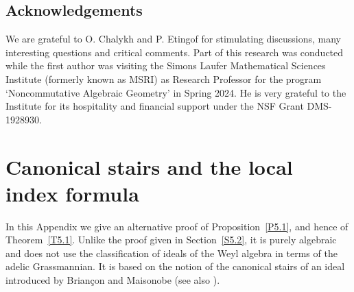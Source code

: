\documentclass[11pt,reqno]{amsart}
\theoremstyle{plain}
\theoremstyle{definition}
\theoremstyle{remark}
\numberwithin{equation}{section}
\begin{document}
\subsection*{Acknowledgements}
We are grateful to O. Chalykh and P. Etingof for stimulating discussions, many interesting questions and critical comments. Part of this research was conducted while the first author was visiting the Simons Laufer Mathematical Sciences Institute (formerly known as MSRI) as Research Professor for the program `Noncommutative Algebraic Geometry' in Spring 2024. He is very grateful to the Institute for its hospitality and financial support under the NSF Grant DMS-1928930. 


\appendix
\section{Canonical stairs and the local index formula}
\label{SA}

In this Appendix we give an alternative proof of Proposition~\ref{P5.1}, and hence of
Theorem~\ref{T5.1}. Unlike the proof given in Section~\ref{S5.2}, it is purely algebraic and does
not use the classification of ideals of the Weyl algebra in terms of the adelic Grassmannian. It
is based on the notion of the canonical stairs of an ideal introduced by Brian\c{c}on and
Maisonobe \cite{BM84} (see also \cite{Maisonobe}).
\end{document}

